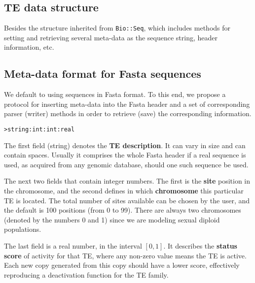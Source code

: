 \documentclass[10pt]{article}
\begin{document}

\subsection{TE data structure}

Besides the structure inherited from \verb|Bio::Seq|, which includes
methods for setting and retrieving several meta-data as the sequence
string, header information, etc.



\subsection{Meta-data format for Fasta sequences}

We default to using sequences in Fasta format. To this end, we propose
a protocol for inserting meta-data into the Fasta header and a set of
corresponding parser (writer) methods in order to retrieve (save) the
corresponding information.


\bigskip
\verb|>string:int:int:real|
\bigskip

The first field (string) denotes the {\bf TE description}. It can vary
in size and can contain spaces. Usually it comprises the whole Fasta
header if a real sequence is used, as acquired from any genomic
database, should one such sequence be used.

The next two fields that contain integer numbers. The first is the
{\bf site} position in the chromosome, and the second defines in which
{\bf chromosome} this particular TE is located. The total number of
sites available can be chosen by the user, and the default is 100
positions (from 0 to 99). There are always two chromosomes (denoted by
the numbers 0 and 1) since we are modeling sexual diploid
populations.

The last field is a real number, in the interval $[0,1]$. It describes
the {\bf status score} of activity for that TE, where any non-zero
value means the TE is active. Each new copy generated from this copy
should have a lower score, effectively reproducing a deactivation
function for the TE family.
\end{document}
